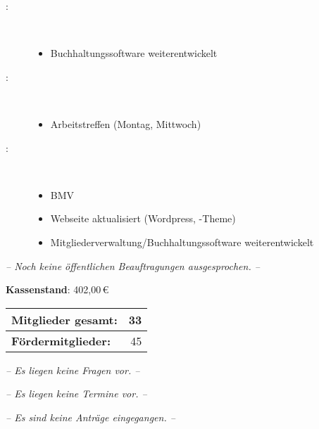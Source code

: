 \begin{Protokoll}
\begin{description}
		\item[:] \     
		\begin{itemize}
			\item Buchhaltungssoftware weiterentwickelt
		\end{itemize}
		\item[:] \     
		\begin{itemize}
			\item Arbeitstreffen (Montag, Mittwoch)
		\end{itemize}
		\item[:] \     
		\begin{itemize}
			\item BMV
			\item Webseite aktualisiert (Wordpress, -Theme)
			\item Mitgliederverwaltung/Buchhaltungssoftware weiterentwickelt
		\end{itemize}
	\end{description}
		
		    
		
		
	\emph{-- Noch keine öffentlichen Beauftragungen ausgesprochen. --}
		
		
	\textbf{Kassenstand}: 402,00\,\euro
		
	\begin{center}
		\begin{tabular}{|l||r|}
			\hline
			\textbf{Mitglieder gesamt:} & 33 \\
			\hline
			\textbf{Fördermitglieder:} & 45 \\                
			\hline
			\hline
		\end{tabular}
	\end{center}
		
	\emph{-- Es liegen keine Fragen vor. --}
		
	\TOP{Termine}
	\emph{-- Es liegen keine Termine vor. --}
		
	\emph{-- Es sind keine Anträge eingegangen. --}
		
	\newpage


\end{Protokoll}
